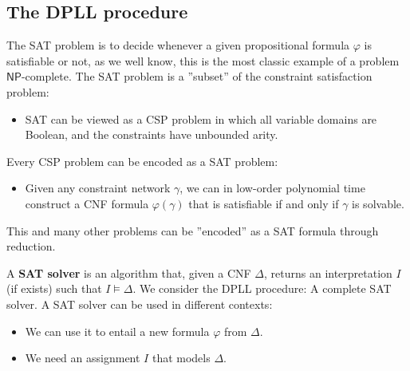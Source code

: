 \documentclass[10pt, letterpaper]{report}
\begin{document}
\subsection{The DPLL procedure}
The SAT problem is to decide whenever a given propositional formula $\varphi$ is satisfiable or not, as we well know, this is the most classic example of a problem $\mathsf{NP}$-complete. The SAT problem is a ''subset'' of the constraint satisfaction problem:\begin{itemize}
    \item SAT can be viewed as a CSP problem in which all variable domains
 are Boolean, and the constraints have unbounded arity.
\end{itemize}
Every CSP problem can be encoded as a SAT problem:\begin{itemize}
    \item Given any constraint network $\gamma$, we can in low-order polynomial time
 construct a CNF formula $\varphi(\gamma)$ that is satisfiable if and only if $\gamma$ is solvable.
\end{itemize}
This and many other problems can be ''encoded'' as a SAT formula through reduction.
\bigskip 

\noindent A \textbf{SAT solver} is an algorithm that, given a CNF $\Delta$, returns an interpretation $I$ (if exists) such that $I\models \Delta$. We consider the DPLL procedure: A complete SAT solver. A SAT solver can be used in different contexts:\begin{itemize}
    \item We can use it to entail a new formula $\varphi$ from $\Delta$. 
    \item We need an assignment $I$ that models $\Delta$.
\end{itemize}
\end{document}

